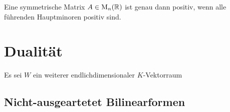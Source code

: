 \begin{lemma}[Hauptminorenkriterium]
  Eine symmetrische Matrix $A \in \operatorname{M}_{n}(\mathbb{R})$ ist genau dann positiv, wenn alle führenden Hauptminoren positiv sind.
\end{lemma}





\section{Dualität}

Es sei $W$ ein weiterer endlichdimensionaler $K$-Vektorraum



\subsection{Nicht-ausgeartetet Bilinearformen}


